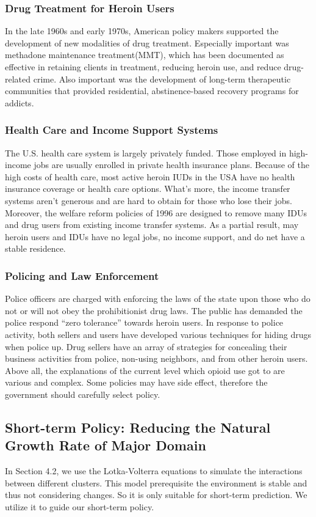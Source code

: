 \documentclass[11pt]{article}
\begin{document}
\subsubsection{Drug Treatment for Heroin Users}
In the late 1960s and early 1970s, American policy makers supported the development of new modalities of drug treatment. Especially important was methadone maintenance treatment(MMT), which has been documented as effective in retaining clients in treatment, reducing heroin use, and reduce drug-related crime. Also important was the development of long-term therapeutic communities that provided residential, abstinence-based recovery programs for addicts.

\subsubsection{Health Care and Income Support Systems}
The U.S. health care system is largely privately funded. Those employed in high-income jobs are usually enrolled in private health insurance plans. Because of the high costs of health care, most active heroin IUDs in the USA have no health insurance coverage or health care options. What’s more, the income transfer systems aren’t generous and are hard to obtain for those who lose their jobs. Moreover, the welfare reform policies of 1996 are designed to remove many IDUs and drug users from existing income transfer systems. As a partial result, may heroin users and IDUs have no legal jobs, no income support, and do net have a stable residence. 

\subsubsection{Policing and Law Enforcement}
Police officers are charged with enforcing the laws of the state upon those who do not or will not obey the prohibitionist drug laws. The public has demanded the police respond “zero tolerance” towards heroin users. In response to police activity, both sellers and users have developed various techniques for hiding drugs when police up. Drug sellers have an array of strategies for concealing their business activities from police, non-using neighbors, and from other heroin users.
Above all, the explanations of the current level which opioid use got to are various and complex. Some policies may have side effect, therefore the government should carefully select policy.

\subsection{Short-term Policy: Reducing the Natural Growth Rate of Major Domain}
In Section 4.2, we use the Lotka-Volterra equations to simulate the interactions between different clusters. This model prerequisite the environment is stable and thus not considering changes. So it is only suitable for short-term prediction. We utilize it to guide our short-term policy.
\end{document}
